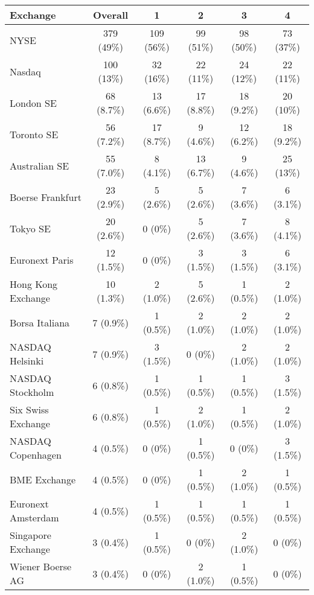 \documentclass[12pt]{article}
\begin{document}
\begin{table}
    \centering
    \label{tab:exchngs}
    
    \begin{tabular}{lccccc}
        \toprule
        Exchange & Overall & 1  & 2 & 3 & 4 \\
        \midrule
        NYSE & 379 (49\%) & 109 (56\%) & 99 (51\%) & 98 (50\%) & 73 (37\%)\\
        Nasdaq & 100 (13\%) & 32 (16\%) & 22 (11\%) & 24 (12\%) & 22 (11\%)\\
        London SE & 68 (8.7\%) & 13 (6.6\%) & 17 (8.8\%) & 18 (9.2\%) & 20 (10\%)\\
        Toronto SE & 56 (7.2\%) & 17 (8.7\%) & 9 (4.6\%) & 12 (6.2\%) & 18 (9.2\%)\\
        Australian SE & 55 (7.0\%) & 8 (4.1\%) & 13 (6.7\%) & 9 (4.6\%) & 25 (13\%)\\
        Boerse Frankfurt & 23 (2.9\%) & 5 (2.6\%) & 5 (2.6\%) & 7 (3.6\%) & 6 (3.1\%)\\
        Tokyo SE & 20 (2.6\%) & 0 (0\%) & 5 (2.6\%) & 7 (3.6\%) & 8 (4.1\%)\\
        Euronext Paris & 12 (1.5\%) & 0 (0\%) & 3 (1.5\%) & 3 (1.5\%) & 6 (3.1\%)\\
        Hong Kong Exchange & 10 (1.3\%) & 2 (1.0\%) & 5 (2.6\%) & 1 (0.5\%) & 2 (1.0\%)\\
        Borsa Italiana & 7 (0.9\%) & 1 (0.5\%) & 2 (1.0\%) & 2 (1.0\%) & 2 (1.0\%)\\
        NASDAQ Helsinki & 7 (0.9\%) & 3 (1.5\%) & 0 (0\%) & 2 (1.0\%) & 2 (1.0\%)\\
        NASDAQ Stockholm & 6 (0.8\%) & 1 (0.5\%) & 1 (0.5\%) & 1 (0.5\%) & 3 (1.5\%)\\
        Six Swiss Exchange & 6 (0.8\%) & 1 (0.5\%) & 2 (1.0\%) & 1 (0.5\%) & 2 (1.0\%)\\
        NASDAQ Copenhagen & 4 (0.5\%) & 0 (0\%) & 1 (0.5\%) & 0 (0\%) & 3 (1.5\%)\\
        BME Exchange & 4 (0.5\%) & 0 (0\%) & 1 (0.5\%) & 2 (1.0\%) & 1 (0.5\%)\\
        Euronext Amsterdam & 4 (0.5\%) & 1 (0.5\%) & 1 (0.5\%) & 1 (0.5\%) & 1 (0.5\%)\\
        Singapore Exchange & 3 (0.4\%) & 1 (0.5\%) & 0 (0\%) & 2 (1.0\%) & 0 (0\%)\\
        Wiener Boerse AG & 3 (0.4\%) & 0 (0\%) & 2 (1.0\%) & 1 (0.5\%) & 0 (0\%)\\

\end{tabular}
\end{table}
\end{document}
